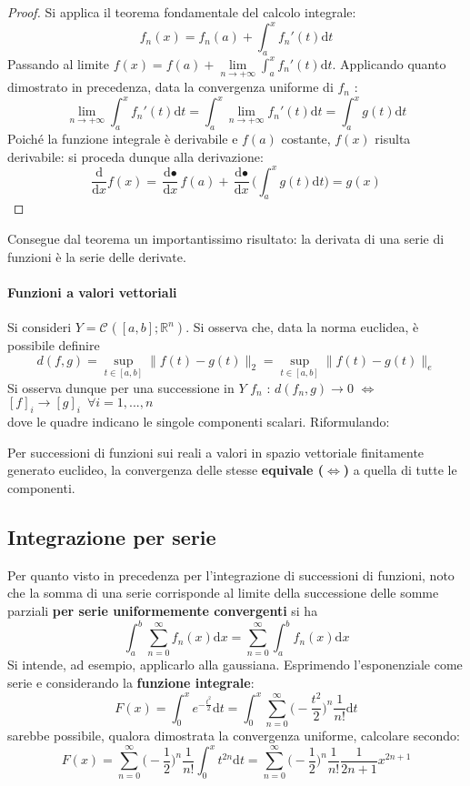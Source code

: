 \documentclass[10pt]{article}
\theoremstyle{plain}
\begin{document}
\begin{proof}
Si applica il teorema fondamentale del calcolo integrale:
\[f_n(x) = f_n(a) + \int_{a}^{x}f_n'(t)\textrm{d}t\]
Passando al limite $\displaystyle f(x) = f(a) + \lim\limits_{n \rightarrow +\infty}\int_{a}^{x}f_n'(t)\textrm{d}t$. Applicando quanto dimostrato in precedenza, data la convergenza uniforme di $f_n$ :
\[\lim\limits_{n \rightarrow +\infty}\int_{a}^{x}f_n'(t)\textrm{d}t = \int_{a}^{x} \lim\limits_{n \rightarrow +\infty}f_n'(t)\textrm{d}t = \int_{a}^{x}g(t)\textrm{d}t\]
Poiché la funzione integrale è derivabile e $f(a)$ costante, $f(x)$ risulta derivabile: si proceda dunque alla derivazione:
\[\frac{\textrm{d}}{\textrm{d}x}f(x) = \frac{\textrm{d} •}{\textrm{d}x}f(a) + \frac{\textrm{d} •}{\textrm{d}x}\bigg(\int_{a}^{x}g(t)\textrm{d}t\bigg) = g(x)\]
\end{proof}

Consegue dal teorema un importantissimo risultato: la derivata di una serie di funzioni è la serie delle derivate.

\paragraph{Funzioni a valori vettoriali}
Si consideri $Y = \mathcal{C}^{}([a,b] ; \mathbb{R}^n)$. Si osserva che, data la norma euclidea, è possibile definire
\[d(f,g) = \sup\limits_{t \in [a,b]} \|f(t) - g(t)\|_2 = \sup\limits_{t \in [a,b]} \|f(t) - g(t)\|_e\]
Si osserva dunque per una successione in $Y$ $f_n$ : $d(f_n , g) \rightarrow 0$ $\Leftrightarrow$ $[f]_i \rightarrow [g]_i \enspace \forall i = 1, ..., n$
\\dove le quadre indicano le singole componenti scalari. Riformulando:
\begin{oss}
Per successioni di funzioni sui reali a valori in spazio vettoriale finitamente generato euclideo, la convergenza delle stesse \textbf{equivale ($\mathbf{\Leftrightarrow}$)} a quella di tutte le componenti.
\end{oss}

\subsection{Integrazione per serie}
Per quanto visto in precedenza per l'integrazione di successioni di funzioni, noto che la somma di una serie corrisponde al limite della successione delle somme parziali \textbf{per serie uniformemente convergenti} si ha
\[\int_{a}^{b}\sum\limits_{n=0}^\infty f_n(x)\textrm{d}x = \sum\limits_{n=0}^\infty \int_{a}^{b}f_n(x)\textrm{d}x\]
Si intende, ad esempio, applicarlo alla gaussiana. Esprimendo l'esponenziale come serie e considerando la \textbf{funzione integrale}:
\[F(x) = \int_{0}^{x}e^{\displaystyle -\frac{t^2}{2}}\textrm{d}t = \int_{0}^{x}\sum\limits_{n=0}^\infty\big( - \frac{t^2}{2}\big)^n\frac{1}{n!}\textrm{d}t\]
sarebbe possibile, qualora dimostrata la convergenza uniforme, calcolare secondo:
\[F(x) = \sum\limits_{n=0}^\infty \big( - \frac{1}{2}\big)^n\frac{1}{n!}\int_{0}^{x}t^{2n}\textrm{d}t = \sum\limits_{n=0}^\infty \big( - \frac{1}{2}\big)^n\frac{1}{n!}\frac{1}{2n + 1}x^{2n + 1}\]
\end{document}

